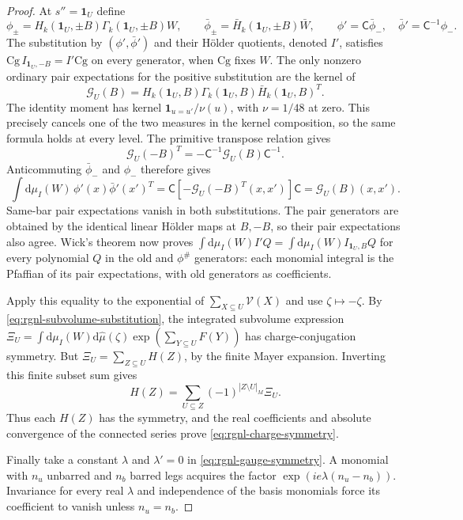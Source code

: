 \documentclass[11pt,letterpaper,reqno]{amsart}
\newcommand{\dd}{\mathrm d}
\begin{document}
\begin{proof}
At $s''=\mathbf1_U$ define
\[
 \phi_\pm=H_k(\mathbf1_U,\pm B)\Gamma_k(\mathbf1_U,\pm B)W,
 \qquad
 \bar\phi_\pm=\bar H_k(\mathbf1_U,\pm B)\bar W,
 \qquad
 \phi'=\mathsf C\bar\phi_-,\quad
 \bar\phi'=\mathsf C^{-1}\phi_-.
\]
The substitution by $(\phi',\bar\phi')$ and their
H\"older quotients, denoted $I'$, satisfies
$\mathrm{Cg}\,I_{\mathbf1_U,-B}=I'\mathrm{Cg}$
on every generator, when $\mathrm{Cg}$ fixes $W$.
The only nonzero ordinary pair expectations for the
positive substitution are the kernel of
\[
 \mathcal G_U(B)
        =H_k(\mathbf1_U,B)\Gamma_k(\mathbf1_U,B)
                                            \bar H_k(\mathbf1_U,B)^T.
\]
The identity moment has kernel
$\mathbf1_{u=u'}/\nu(u)$, with $\nu=1/48$ at zero.
This precisely cancels one of the two measures in
the kernel composition, so the same formula holds
at every level. The primitive transpose relation gives
\[
 \mathcal G_U(-B)^T
                      =-\mathsf C^{-1}\mathcal G_U(B)\mathsf C^{-1}.
\]
Anticommuting $\bar\phi_-$ and $\phi_-$ therefore gives
\[
 \int\dd\mu_I(W)\,\phi'(x)\bar\phi'(x')^T
     =\mathsf C[-\mathcal G_U(-B)^T(x,x')]\mathsf C
     =\mathcal G_U(B)(x,x').
\]
Same-bar pair expectations vanish in both substitutions.
The pair generators are obtained by the identical
linear H\"older maps at $B,-B$, so their pair expectations
also agree. Wick's theorem now proves
$\int\dd\mu_I(W)I'Q=\int\dd\mu_I(W)I_{\mathbf1_U,B}Q$
for every polynomial $Q$ in the old and $\phi^\#$
generators: each monomial integral is the Pfaffian of
its pair expectations, with old generators as coefficients.

Apply this equality to the exponential of
$\sum_{X\subseteq U}\mathcal V(X)$ and use
$\zeta\mapsto-\zeta$. By
\eqref{eq:rgnl-subvolume-substitution}, the integrated
subvolume expression
$\Xi_U=\int\dd\mu_I(W)\dd\widehat\mu(\zeta)
\exp(\sum_{Y\subseteq U}F(Y))$
has charge-conjugation symmetry.
But $\Xi_U=\sum_{Z\subseteq U}H(Z)$, by the finite
Mayer expansion. Inverting this finite subset sum gives
\[
 H(Z)=\sum_{U\subseteq Z}(-1)^{|Z\setminus U|_M}\Xi_U.
\]
Thus each $H(Z)$ has the symmetry, and the real
coefficients and absolute convergence of the connected
series prove \eqref{eq:rgnl-charge-symmetry}.

Finally take a constant $\lambda$ and $\lambda'=0$
in \eqref{eq:rgnl-gauge-symmetry}. A monomial with
$n_u$ unbarred and $n_b$ barred legs acquires the factor
$\exp(ie\lambda(n_u-n_b))$. Invariance for every real
$\lambda$ and independence of the basis monomials force
its coefficient to vanish unless $n_u=n_b$.
\end{proof}
\end{document}
